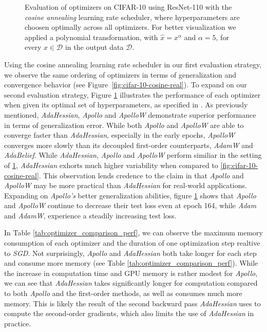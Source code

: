 \begin{figure}[h!]
    \centering
    \begin{tabular}{cc}
         \\ %
    \end{tabular}
    \caption{Evaluation of optimizers on CIFAR-10 using ResNet-110 with the \emph{cosine annealing} learning rate scheduler, where hyperparameters
    are choosen optimally across all optimizers. For better visualization we applied a polynomial transformation, with $\hat{x}=x^\alpha$ and $\alpha=5$, for every $x \in \mathcal{D}$ in the output data $ \mathcal{D}$. }
    \label{fig:cifar-10-cosine-second}
\end{figure}
Using the cosine annealing learning rate scheduler in our first evaluation strategy,
we observe the same ordering of optimizers in terms of generalization and convergence behavior (see Figure~\ref{fig:cifar-10-cosine-real}).
To expand on our second evaluation strategy, Figure \ref{fig:cifar-10-cosine-second}
illustrates the performance of each optimizer when given its optimal set of hyperparameters,
as specified in \cite{apollo}. As previously mentioned, \emph{AdaHessian}, \emph{Apollo} and 
\emph{ApolloW} demonstrate superior performance in terms of generalization error. While both \emph{Apollo} and \emph{ApolloW} are able to converge faster than \emph{AdaHessian},
especially in the early epochs, \emph{ApolloW} converges more slowly than its decoupled first-order counterparts,
\emph{AdamW} and \emph{AdaBelief}.
While \emph{AdaHessian}, \emph{Apollo} and \emph{ApolloW} perform similiar in the setting of 
\ref{fig:cifar-10-cosine-second}, \emph{AdaHessian} exhorts much higher variability when compared to 
\ref{fig:cifar-10-cosine-real}. This observation lends credence to the claim in \cite{apollo} that \emph{Apollo} and \emph{ApolloW} 
may be more practical than \emph{AdaHessian} for real-world applications.\\
Expanding on \emph{Apollo's} better generalization abilities, figure \ref{fig:cifar-10-cosine-second} shows that \emph{Apollo} and \emph{ApolloW} continue to decrease their
test loss even at epoch 164, while \emph{Adam} and \emph{AdamW},
experience a steadily increasing test loss.

In Table \ref{tab:optimizer_comparison_perf}, we can observe the maximum memory consumption
of each optimizer and the duration of one optimization step realtive to \emph{SGD}.
Not surprisingly, \emph{Apollo} and \emph{AdaHessian} both take longer for each step and
consume more memory (see Table \ref{tab:optimizer_comparison_perf}). While the increase in computation time and GPU memory is
rather modest for \emph{Apollo}, we can see that \emph{AdaHessian} takes significantly
longer for computation compared to both \emph{Apollo} and the first-order
 methods, as well as consumes much more memory. This is likely the result of
the second backward pass \emph{AdaHessian} uses to compute the second-order gradients,
which also limits the use of \emph{AdaHessian} in practice.


